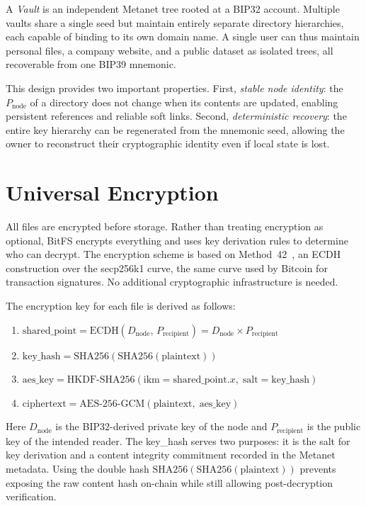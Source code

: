 \documentclass[11pt,a4paper]{article}
\begin{document}
A \emph{Vault} is an independent Metanet tree rooted at a BIP32 account. Multiple vaults share a single seed but maintain entirely separate directory hierarchies, each capable of binding to its own domain name. A single user can thus maintain personal files, a company website, and a public dataset as isolated trees, all recoverable from one BIP39 mnemonic.

This design provides two important properties. First, \emph{stable node identity}: the $P_{\text{node}}$ of a directory does not change when its contents are updated, enabling persistent references and reliable soft links. Second, \emph{deterministic recovery}: the entire key hierarchy can be regenerated from the mnemonic seed, allowing the owner to reconstruct their cryptographic identity even if local state is lost.

\section{Universal Encryption}

All files are encrypted before storage. Rather than treating encryption as optional, BitFS encrypts everything and uses key derivation rules to determine who can decrypt. The encryption scheme is based on Method~42~\cite{method42}, an ECDH construction over the secp256k1 curve, the same curve used by Bitcoin for transaction signatures. No additional cryptographic infrastructure is needed.

The encryption key for each file is derived as follows:

\begin{enumerate}
\item $\text{shared\_point} = \text{ECDH}(D_{\text{node}},\, P_{\text{recipient}}) = D_{\text{node}} \times P_{\text{recipient}}$
\item $\text{key\_hash} = \text{SHA256}(\text{SHA256}(\text{plaintext}))$
\item $\text{aes\_key} = \text{HKDF-SHA256}(\text{ikm}=\text{shared\_point}.x,\; \text{salt}=\text{key\_hash})$
\item $\text{ciphertext} = \text{AES-256-GCM}(\text{plaintext},\; \text{aes\_key})$
\end{enumerate}

Here $D_{\text{node}}$ is the BIP32-derived private key of the node and $P_{\text{recipient}}$ is the public key of the intended reader. The key\_hash serves two purposes: it is the salt for key derivation and a content integrity commitment recorded in the Metanet metadata. Using the double hash $\text{SHA256}(\text{SHA256}(\text{plaintext}))$ prevents exposing the raw content hash on-chain while still allowing post-decryption verification.
\end{document}

